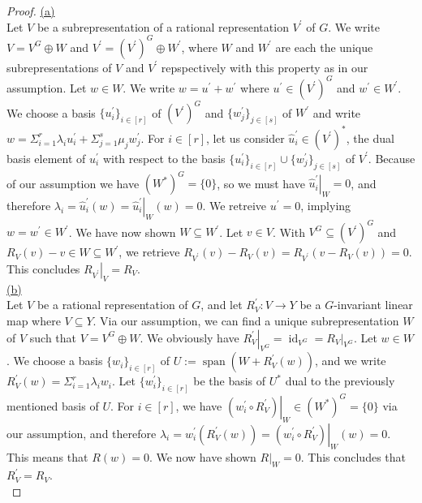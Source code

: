 \begin{proof}
  \hfill \break
  \underline{(a)}\\
  Let $V$ be a subrepresentation of a rational representation $V^\prime$ of $G$.
  We write $V = V^G \oplus W$ and $V^\prime = (V^\prime)^G \oplus W^\prime$, where $W$ and $W^\prime$ are each the unique subrepresentations of $V$ and $V^\prime$ repspectively with this property as in our assumption.
  Let $w \in W$.
  We write $w = u^\prime + w^\prime$ where $u^\prime \in (V^\prime)^G$ and $w^\prime \in W^\prime$.
  We choose a basis $\{u^\prime_i\}_{i \in [r]}$ of $(V^\prime)^G$ and $\{w^\prime_j\}_{j \in [s]}$ of $W^\prime$ and write $w = \Sigma_{i=1}^r \lambda_i u^\prime_i + \Sigma_{j=1}^s \mu_j w^\prime_j$.
  For $i \in [r]$, let us consider $\hat{u}^\prime_i \in (V^\prime)^\ast$, the dual basis element of $u^\prime_i$ with respect to the basis $\{u^\prime_i\}_{i \in [r]} \cup \{w^\prime_j\}_{j \in [s]}$ of $V^\prime$.
  Because of our assumption we have $(W^\ast)^G = \{0\}$, so we must have $\left. \hat{u}^\prime_i \right|_W = 0$, and therefore $\lambda_i = \hat{u}^\prime_i (w) = \left. \hat{u}^\prime_i \right|_W (w) = 0$.
  We retreive $u^\prime = 0$, implying $ w  = w^\prime \in W^\prime $.
  We have now shown $W \subseteq W^\prime$.
  Let $v \in V$.
  With $V^G \subseteq (V^\prime)^G$ and $R_V (v) - v \in W \subseteq W^\prime$, we retrieve $R_{V^\prime}(v) - R_V (v) = R_{V^\prime}(v - R_V(v)) = 0$.
  This concludes $\left. R_{V^\prime} \right|_V = R_V$.  \\
  \underline{(b)}\\
  Let $V$ be a rational representation of $G$, and let $R^\prime_V \colon V \longrightarrow Y$ be a $G$-invariant linear map where $V \subseteq Y$.
  Via our assumption, we can find a unique subrepresentation $W$ of $V$ such that $V = V^G \oplus W$.
  We obviously have $\left. R^\prime_V \right|_{V^G} = \operatorname{id}_{V^G} = \left. R_V \right|_{V^G}$.
  Let $w \in W$.
  We choose a basis $\{w_i\}_{i \in [r]}$ of $U:= \operatorname{span}(W + R^\prime_V (w))$, and we write $R^\prime_V (w) = \Sigma_{i=1}^r \lambda_i w_i$.
  Let $\{w^\prime_i\}_{i \in [r]}$ be the basis of $U^\ast$ dual to the previously mentioned basis of $U$.
  For $i \in [r]$, we have $\left. (w^\prime_i \circ R^\prime_V) \right|_W \in (W^\ast)^G = \{0\}$ via our assumption, and therefore $ \lambda_i = w^\prime_i (R^\prime_V(w)) = \left. (w^\prime_i \circ R^\prime_V) \right|_W (w) = 0$.
  This means that $R(w) = 0$.
  We now have shown $\left. R \right|_{W} = 0$.
  This concludes that $R^\prime_V = R_V$.  \\

\end{proof}
